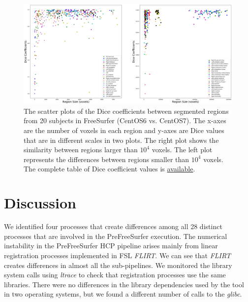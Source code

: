 \documentclass[a4paper,num-refs]{oup-contemporary}
\begin{document}
\begin{figure}
  \centering
    \includegraphics[width=\textwidth]{images/scatter_plot.png} 
    \caption{The scatter plots of the Dice coefficients between segmented regions 
            from 20 subjects in FreeSurfer (CentOS6 vs. CentOS7). 
            The x-axes are the number of voxels in each region and 
            y-axes are Dice values that are in different scales in two plots.
            The right plot shows the similarity between regions larger than $10^4$ voxels. 
            The left plot represents the differences between 
            regions smaller than $10^4$ voxels.
            The complete table of Dice coefficient values is 
            \href{https://github.com/ali4006/HCP-reproducibility-paper/blob/master/data/dice_values.csv}
            {available}.} 
    \label{fig:scatter_plot}
  \end{figure}

  

\section{Discussion}

We identified four processes that create differences 
among all 28 distinct processes that are involved in the PreFreeSurfer execution. 
The numerical instability in the 
PreFreeSurfer HCP pipeline arises mainly from linear 
registration processes implemented in FSL \emph{FLIRT}. 
We can see that \emph{FLIRT} creates differences in almost all the sub-pipelines. 
We monitored the library system calls using \emph{ltrace} to check that registration processes
use the same libraries. There were no differences in the library dependencies used by 
the tool in two operating systems, but we found a different number of calls to the \emph{glibc}.
\end{document}
